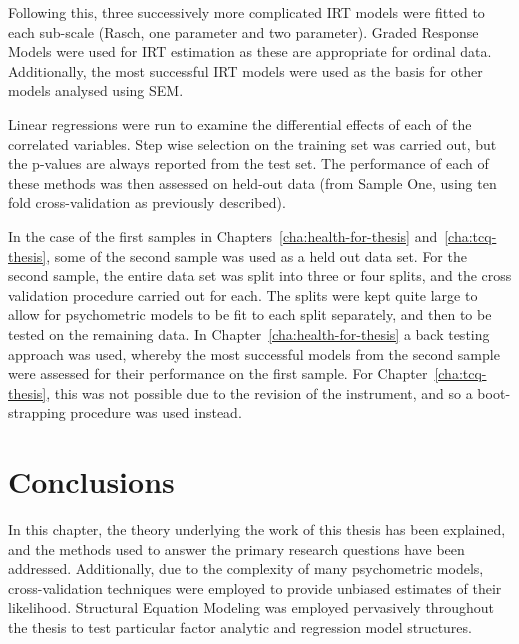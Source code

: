 Following this, three successively more complicated IRT models were fitted to each sub-scale (Rasch, one parameter and two parameter). Graded Response Models were used for IRT estimation as these are appropriate for ordinal data. Additionally, the most successful IRT models were used as the basis for other models analysed using SEM. 


Linear regressions were run to examine the differential effects of each of the correlated variables. Step wise selection on the training set was carried out, but the p-values are always reported from the test set. The performance of each of these methods was then assessed on held-out data (from Sample One, using ten fold cross-validation as previously described). 

In the case of the first samples in Chapters~\ref{cha:health-for-thesis} and~\ref{cha:tcq-thesis}, some of the second sample was used as a held out data set. For the second sample, the entire data set was split into three or four splits, and the cross validation procedure carried out for each. The splits were kept quite large  to allow for psychometric models to be fit to each split separately, and then to be tested on the remaining data. In Chapter~\ref{cha:health-for-thesis} a back testing approach was used, whereby the most successful models from the second sample were assessed for their performance on the first sample. For Chapter~\ref{cha:tcq-thesis}, this was not possible due to the revision of the instrument, and so a boot-strapping procedure was used instead.


\section{Conclusions}
\label{sec:conclusions}


In this chapter, the theory underlying the work of this thesis has been explained, and the methods used to answer the primary research questions have been addressed. Additionally, due to the complexity of many psychometric models, cross-validation techniques were employed to provide unbiased estimates of their likelihood. %
Structural Equation Modeling was employed pervasively throughout the thesis to test particular factor analytic and regression model structures.




